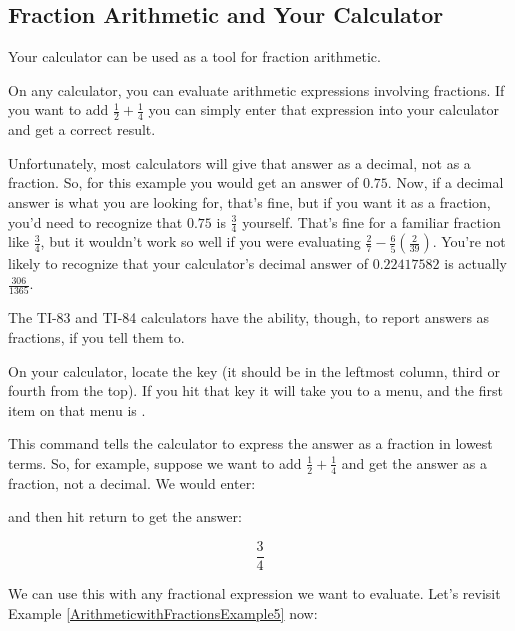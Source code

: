 \subsection{Fraction Arithmetic and Your Calculator}

Your calculator can be used as a tool for fraction arithmetic.

On any calculator, you can evaluate arithmetic expressions involving fractions. If you want to add $\displaystyle \frac{1}{2} + \frac{1}{4}$ you can simply enter that expression into your calculator and get a correct result.

Unfortunately, most calculators will give that answer as a decimal, not as a fraction.  So, for this example you would get an answer of $0.75$. Now, if a decimal answer is what you are looking for, that’s fine, but if you want it as a fraction, you’d need to recognize that $0.75$ is $\frac{3}{4}$ yourself. That’s fine for a familiar fraction like $\frac{3}{4}$, but it wouldn’t work so well if you were evaluating $\displaystyle \frac{2}{7} - \frac{6}{5}\left(\frac{2}{39}\right)$.  You’re not likely to recognize that your calculator’s decimal answer of $0.22417582$ is actually $\displaystyle \frac{306}{1365}$.

The TI-83 and TI-84 calculators have the ability, though, to report answers as fractions, if you tell them to.

On your calculator, locate the  key (it should be in the leftmost column, third or fourth from the top). If you hit that key it will take you to a menu, and the first item on that menu is .

This command tells the calculator to express the answer as a fraction in lowest terms.  So, for example, suppose we want to add $\displaystyle \frac{1}{2} + \frac{1}{4}$ and get the answer as a fraction, not a decimal. We would enter:


and then hit return to get the answer:

$$\frac{3}{4}$$

We can use this with any fractional expression we want to evaluate. Let’s revisit Example \ref{ArithmeticwithFractionsExample5} now:



